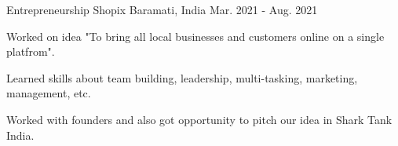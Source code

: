 \begin{cventries}
  \cventry
    {Entrepreneurship} %
    {Shopix} %
    {Baramati, India} %
    {Mar. 2021 - Aug. 2021} %
    {
      \begin{cvitems} %
        \item {Worked on idea "To bring all local businesses and customers online on a single platfrom".}
        \item {Learned skills about team building, leadership, multi-tasking, marketing, management, etc.}
        \item {Worked with founders and also got opportunity to pitch our idea in Shark Tank India. }
      \end{cvitems}
    }

\end{cventries}
